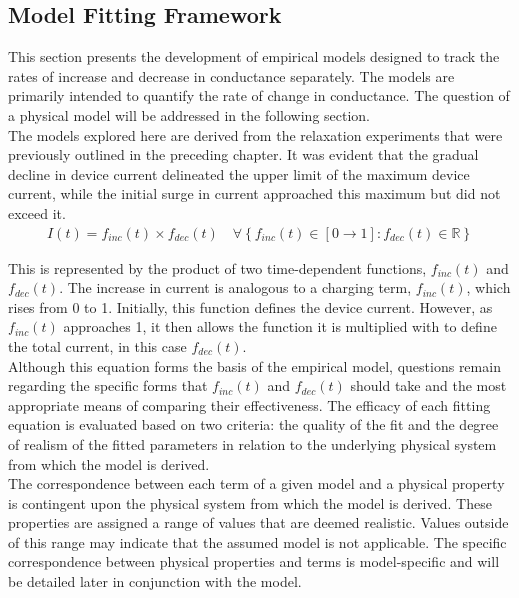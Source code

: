 \subsection[Model Fitting Framework]{Model Fitting Framework}

This section presents the development of empirical models designed to track the rates of increase and decrease in conductance separately. The models are primarily intended to quantify the rate of change in conductance. The question of a physical model will be addressed in the following section.\\

\noindent The models explored here are derived from the relaxation experiments that were previously outlined in the preceding chapter. It was evident that the gradual decline in device current delineated the upper limit of the maximum device current, while the initial surge in current approached this maximum but did not exceed it. 
\begin{align}
I(t) = f_{inc}(t) \times f_{dec}(t) \quad \forall \left\{ f_{inc}(t) \in [0 \to 1] : f_{dec}(t) \in \mathbb{R} \right\} \label{eq:2.21}
\end{align}

\noindent This is represented by the product of two time-dependent functions, $f_{inc}(t)$ and $f_{dec}(t)$. The increase in current is analogous to a charging term, $f_{inc}(t)$, which rises from 0 to 1. Initially, this function defines the device current. However, as $f_{inc}(t)$ approaches 1, it then allows the function it is multiplied with to define the total current, in this case  $f_{dec}(t)$. \\

\noindent Although this equation forms the basis of the empirical model, questions remain regarding the specific forms that $f_{inc}(t)$ and $f_{dec}(t)$ should take and the most appropriate means of comparing their effectiveness. The efficacy of each fitting equation is evaluated based on two criteria: the quality of the fit and the degree of realism of the fitted parameters in relation to the underlying physical system from which the model is derived.\\

\noindent The correspondence between each term of a given model and a physical property is contingent upon the physical system from which the model is derived. These properties are assigned a range of values that are deemed realistic. Values outside of this range may indicate that the assumed model is not applicable. The specific correspondence between physical properties and terms is model-specific and will be detailed later in conjunction with the model.\\

